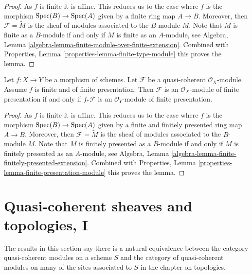 \begin{proof}
As $f$ is finite it is affine. This reduces us to the case where
$f$ is the morphism $\mathop{\mathrm{Spec}}(B) \to \mathop{\mathrm{Spec}}(A)$ given
by a finite ring map $A \to B$.
Moreover, then $\mathcal{F} = \widetilde{M}$ is the sheaf of modules
associated to the $B$-module $M$.
Note that $M$ is finite as a $B$-module if and only if
$M$ is finite as an $A$-module, see
Algebra, Lemma \ref{algebra-lemma-finite-module-over-finite-extension}.
Combined with
Properties, Lemma \ref{properties-lemma-finite-type-module}
this proves the lemma.
\end{proof}

\begin{lemma}
\label{lemma-finite-finitely-presented-module}
Let $f : X \to Y$ be a morphism of schemes.
Let $\mathcal{F}$ be a quasi-coherent $\mathcal{O}_X$-module.
Assume $f$ is finite and of finite presentation.
Then $\mathcal{F}$ is an $\mathcal{O}_X$-module of finite presentation
if and only if $f_*\mathcal{F}$ is an $\mathcal{O}_Y$-module of finite
presentation.
\end{lemma}

\begin{proof}
As $f$ is finite it is affine. This reduces us to the case where
$f$ is the morphism $\mathop{\mathrm{Spec}}(B) \to \mathop{\mathrm{Spec}}(A)$ given
by a finite and finitely presented ring map $A \to B$.
Moreover, then $\mathcal{F} = \widetilde{M}$ is the sheaf of modules
associated to the $B$-module $M$.
Note that $M$ is finitely presented as a $B$-module if and only if
$M$ is finitely presented as an $A$-module, see
Algebra, Lemma \ref{algebra-lemma-finite-finitely-presented-extension}.
Combined with
Properties, Lemma \ref{properties-lemma-finite-presentation-module}
this proves the lemma.
\end{proof}
















\section{Quasi-coherent sheaves and topologies, I}
\label{section-quasi-coherent-sheaves}

\noindent
The results in this section say there is a natural equivalence between
the category quasi-coherent modules on a scheme $S$ and the category
of quasi-coherent modules on many of the sites associated to $S$
in the chapter on topologies.

